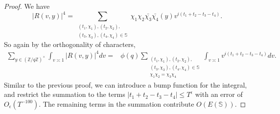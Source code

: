 \begin{proof}
    We have \[
    |R(v,y)|^4 = \sum_{\substack{(t_1,\chi_1),(t_2,\chi_2),\\ (t_3,\chi_3),(t_4,\chi_4)\in \mathbb{S}}}
    \chi_1{\chi}_2\bar{\chi_3}\bar{\chi_4}(y)v^{i(t_1+t_2-t_3-t_4)}.
    \]
    So again by the orthogonality of characters, \begin{align*}
        \sum_{y\in (\mathbb{Z}/q\mathbb{Z})^\times} \int_{v\asymp 1} 
        \left|R\left(v,y\right)\right|^4dv = & \phi(q)
        \sum_{\substack{(t_1,\chi_1),(t_2,\chi_2),\\ (t_3,\chi_3),(t_4,\chi_4)\in \mathbb{S}\\ \chi_1\chi_2=\chi_3\chi_4}} \int_{v\asymp 1} v^{i(t_1+t_2-t_3-t_4)} dv.
    \end{align*}
    Similar to the previous proof, we can introduce a bump function for the integral, and restrict the summation to the terms $|t_1+t_2-t_3-t_4|\leq T^\epsilon$ with an error of $O_\epsilon(T^{-100})$. The remaining terms in the summation contribute $O(E(\mathbb{S}))$.
\end{proof}

